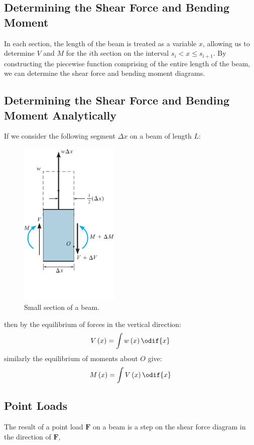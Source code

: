 \documentclass{article}
\begin{document}
\subsection{Determining the Shear Force and Bending Moment}
In each section, the length of the beam is treated as a variable \(x\),
allowing us to determine \(V\) and \(M\) for the \(i\)th section
on the interval \(s_i < x \leq s_{i + 1}\).
By constructing the piecewise function comprising of the entire length of the beam, we can
determine the shear force and bending moment diagrams.
\subsection{Determining the Shear Force and Bending Moment Analytically}
If we consider the following segment \(\Delta{x}\) on a beam of length \(L\):
\begin{figure}[H]
    \centering
    \includegraphics[height = 8cm, keepaspectratio = true]{figures/sfd_bmd_analytic.pdf}
    \caption{Small section of a beam.} %
\end{figure}
then by the equilibrium of forces in the vertical direction:
\begin{equation*}
    V\left( x \right) = \int w\left( x \right) \odif{x}
\end{equation*}
similarly the equilibrium of moments about \(O\) give:
\begin{equation*}
    M\left( x \right) = \int V\left( x \right) \odif{x}
\end{equation*}
\subsection{Point Loads}
The result of a point load \(\symbf{F}\) on a beam is a step on the shear force diagram in the direction of \(\symbf{F}\),
\end{document}
